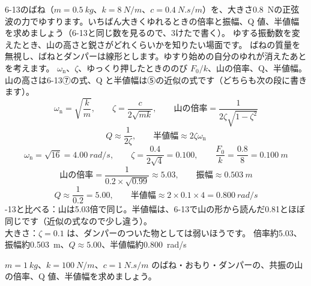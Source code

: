 \label{ph:波-2:ex1}
\begin{phreidai}
6-13のばね（$m=\qty{0.5}{kg}$、$k=\qty{8}{N/m}$、$c=\qty{0.4}{N.s/m}$）を、大きさ\qty{0.8}{N}の正弦波の力でゆすります。いちばん大きくゆれるときの倍率と振幅、Q 値、半値幅を求めましょう（6-13と同じ数を見るので、3けたで書く）。
\phbamen
ゆする振動数を変えたとき、山の高さと鋭さがどれくらいかを知りたい場面です。
\phmushi
ばねの質量を無視し、ばねとダンパーは線形とします。ゆすり始めの自分のゆれが消えたあとを考えます。
\phzu
$\omega_{\mathrm n}$、$\zeta$、ゆっくり押したときののび $F_0/k$、山の倍率、Q、半値幅。
\phriyu
山の高さは6-13⑦の式、Q と半値幅は⑤の近似の式です（どちらも次の段に書きます）。
\phtateru
\[\omega_{\mathrm n}=\sqrt{\frac{k}{m}},\qquad \zeta=\frac{c}{2\sqrt{mk}},\qquad \text{山の倍率}=\frac{1}{2\zeta\sqrt{1-\zeta^2}}\]
\[Q\approx\frac{1}{2\zeta},\qquad \text{半値幅}\approx2\zeta\omega_{\mathrm n}\]
\phtoku
\[\omega_{\mathrm n}=\sqrt{16}=\qty{4.00}{rad/s},\qquad \zeta=\frac{0.4}{2\sqrt{4}}=0.100,\qquad \frac{F_0}{k}=\frac{0.8}{8}=\qty{0.100}{m}\]
\[\text{山の倍率}=\frac{1}{0.2\times\sqrt{0.99}}\approx5.03,\qquad \text{振幅}\approx\qty{0.503}{m}\]
\[Q\approx\frac{1}{0.2}=5.00,\qquad \text{半値幅}\approx2\times0.1\times4=\qty{0.800}{rad/s}\]
-13と比べる：山は5.03倍で同じ。半値幅は、6-13で山の形から読んだ0.81とほぼ同じです（近似の式なので少し違う）。\\
大きさ：$\zeta=0.1$ は、ダンパーのついた物としては弱いほうです。
\kotae 倍率約5.03、振幅約\qty{0.503}{m}、$Q\approx5.00$、半値幅約\qty{0.800}{rad/s}
\end{phreidai}
\begin{jibun}
$m=\qty{1}{kg}$、$k=\qty{100}{N/m}$、$c=\qty{1}{N.s/m}$ のばね・おもり・ダンパーの、共振の山の倍率、Q 値、半値幅を求めましょう。
\end{jibun}

